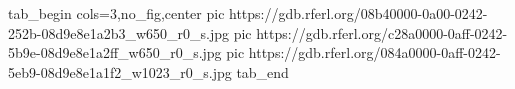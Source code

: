  
 
 
 
 


\ifcmt
  tab_begin cols=3,no_fig,center
     pic https://gdb.rferl.org/08b40000-0a00-0242-252b-08d9e8e1a2b3_w650_r0_s.jpg
     pic https://gdb.rferl.org/c28a0000-0aff-0242-5b9e-08d9e8e1a2ff_w650_r0_s.jpg
     pic https://gdb.rferl.org/084a0000-0aff-0242-5eb9-08d9e8e1a1f2_w1023_r0_s.jpg
  tab_end
\fi

